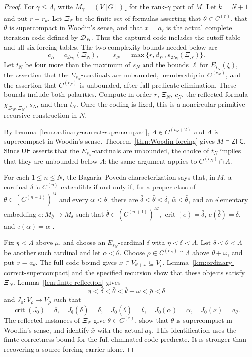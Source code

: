 \documentclass[11pt,a4paper]{amsart}
\newcommand{\ZFC}{\mathsf{ZFC}}
\newcommand{\crit}{\operatorname{crit}}
\newcommand{\UE}{\mathsf{UE}}
\theoremstyle{plain}
\theoremstyle{definition}
\theoremstyle{remark}
\begin{document}
\begin{proof}
For $\gamma\leq\Lambda$, write $M_\gamma=(V[G])_\gamma$ for the rank-$\gamma$ part of $M$.  Let $k=N+1$ and put $r=r_k$.  Let $\Xi_N$ be the finite set of formulas asserting that $\theta\in C^{(r)}$, that $\theta$ is supercompact in Woodin's sense, and that $x=a_\theta$ is the actual complete iteration code defined by $\mathcal D_{\mathrm W}$.  Thus the captured code includes the cutoff table and all six forcing tables.  The two complexity bounds needed below are
\[
c_N=c_{\mathcal D_{\mathrm W}}(\Xi_N),\qquad
s_N=\max\{r,d_{\mathrm W},s_{\mathcal D_{\mathrm W}}(\Xi_N)\}.
\]
Let $t_N$ be four more than the maximum of $s_N$ and the bounds $\ell$ for $E_{s_N}(\xi)$, the assertion that the $E_{s_N}$-cardinals are unbounded, membership in $C^{(c_N)}$, and the assertion that $C^{(c_N)}$ is unbounded, after full predicate elimination.  These bounds include both polarities.  Compute in order $r$, $\Xi_N$, $c_N$, the reflected formula $\chi_{\mathcal D_{\mathrm W},\Xi_N}$, $s_N$, and then $t_N$.  Once the coding is fixed, this is a noncircular primitive-recursive construction in $N$.

By Lemma~\ref{lem:ordinary-correct-supercompact}, $\Lambda\in C^{(t_N+2)}$ and $\Lambda$ is supercompact in Woodin's sense.  Theorem~\ref{thm:Woodin-forcing} gives $M\models\ZFC$.  Since $\UE$ asserts that the $E_{s_N}$-cardinals are unbounded, the choice of $t_N$ implies that they are unbounded below $\Lambda$; the same argument applies to $C^{(c_N)}\cap\Lambda$.

For each $1\leq n\leq N$, the Bagaria--Poveda characterization says that, in $M$, a cardinal $\delta$ is $C^{(n)}$-extendible if and only if, for a proper class of $\theta\in(C^{(n+1)})^M$ and every $\alpha<\theta$, there are $\bar\delta<\bar\theta<\delta$, $\bar\alpha<\bar\theta$, and an elementary embedding $e:M_{\bar\theta}\to M_\theta$ such that $\bar\theta\in(C^{(n+1)})^M$, $\crit(e)=\bar\delta$, $e(\bar\delta)=\delta$, and $e(\bar\alpha)=\alpha$ \cite[Corollary~2.7]{BagariaPoveda}.

Fix $\eta<\Lambda$ above $\mu$, and choose an $E_{s_N}$-cardinal $\delta$ with $\eta<\delta<\Lambda$.  Let $\delta<\theta<\Lambda$ be another such cardinal and let $\alpha<\theta$.  Choose $\rho\in C^{(c_N)}\cap\Lambda$ above $\theta+\omega$, and put $x=a_\theta$.  The full-code bound gives $x\in V_{\theta+\omega}\subseteq V_\rho$.  Lemma~\ref{lem:ordinary-correct-supercompact} and the specified recursion show that these objects satisfy $\Xi_N$.  Lemma~\ref{lem:finite-reflection} gives
\[
\eta<\bar\delta<\bar\theta<\bar\theta+\omega<\bar\rho<\delta
\]
and $J_0:V_{\bar\rho}\to V_\rho$ such that
\[
\crit(J_0)=\bar\delta,\quad J_0(\bar\delta)=\delta,\quad
J_0(\bar\theta)=\theta,\quad J_0(\bar\alpha)=\alpha,
\quad J_0(\bar x)=a_\theta.
\]
The reflected instances of $\Xi_N$ give $\bar\theta\in C^{(r)}$, show that $\bar\theta$ is supercompact in Woodin's sense, and identify $\bar x$ with the actual $a_{\bar\theta}$.  This identification uses the finite correctness bound for the full eliminated code predicate.  It is stronger than recovering a source forcing carrier alone.


\end{proof}
\end{document}
